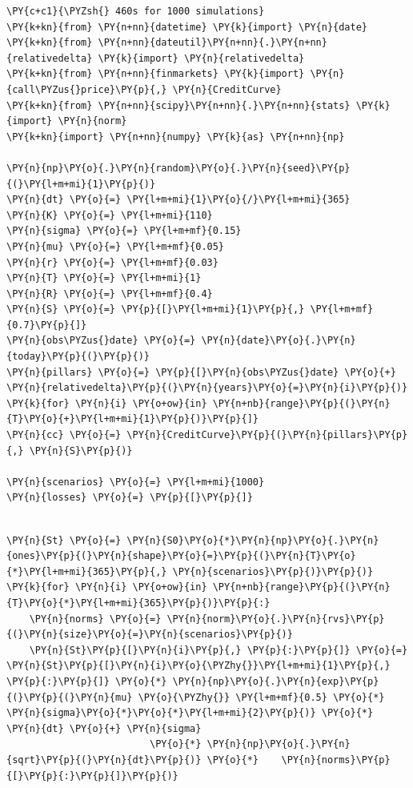 \begin{Answer}
\begin{tcolorbox}[size=fbox, boxrule=1pt, colback=cellbackground, colframe=cellborder]
\begin{Verbatim}[commandchars=\\\{\}]
\PY{c+c1}{\PYZsh{} 460s for 1000 simulations}
\PY{k+kn}{from} \PY{n+nn}{datetime} \PY{k}{import} \PY{n}{date}
\PY{k+kn}{from} \PY{n+nn}{dateutil}\PY{n+nn}{.}\PY{n+nn}{relativedelta} \PY{k}{import} \PY{n}{relativedelta}
\PY{k+kn}{from} \PY{n+nn}{finmarkets} \PY{k}{import} \PY{n}{call\PYZus{}price}\PY{p}{,} \PY{n}{CreditCurve}
\PY{k+kn}{from} \PY{n+nn}{scipy}\PY{n+nn}{.}\PY{n+nn}{stats} \PY{k}{import} \PY{n}{norm}
\PY{k+kn}{import} \PY{n+nn}{numpy} \PY{k}{as} \PY{n+nn}{np}
		
\PY{n}{np}\PY{o}{.}\PY{n}{random}\PY{o}{.}\PY{n}{seed}\PY{p}{(}\PY{l+m+mi}{1}\PY{p}{)}
\PY{n}{dt} \PY{o}{=} \PY{l+m+mi}{1}\PY{o}{/}\PY{l+m+mi}{365}
\PY{n}{K} \PY{o}{=} \PY{l+m+mi}{110}
\PY{n}{sigma} \PY{o}{=} \PY{l+m+mf}{0.15}
\PY{n}{mu} \PY{o}{=} \PY{l+m+mf}{0.05}
\PY{n}{r} \PY{o}{=} \PY{l+m+mf}{0.03}
\PY{n}{T} \PY{o}{=} \PY{l+m+mi}{1}
\PY{n}{R} \PY{o}{=} \PY{l+m+mf}{0.4}
\PY{n}{S} \PY{o}{=} \PY{p}{[}\PY{l+m+mi}{1}\PY{p}{,} \PY{l+m+mf}{0.7}\PY{p}{]}
\PY{n}{obs\PYZus{}date} \PY{o}{=} \PY{n}{date}\PY{o}{.}\PY{n}{today}\PY{p}{(}\PY{p}{)}
\PY{n}{pillars} \PY{o}{=} \PY{p}{[}\PY{n}{obs\PYZus{}date} \PY{o}{+} \PY{n}{relativedelta}\PY{p}{(}\PY{n}{years}\PY{o}{=}\PY{n}{i}\PY{p}{)} \PY{k}{for} \PY{n}{i} \PY{o+ow}{in} \PY{n+nb}{range}\PY{p}{(}\PY{n}{T}\PY{o}{+}\PY{l+m+mi}{1}\PY{p}{)}\PY{p}{]}
\PY{n}{cc} \PY{o}{=} \PY{n}{CreditCurve}\PY{p}{(}\PY{n}{pillars}\PY{p}{,} \PY{n}{S}\PY{p}{)}
		
\PY{n}{scenarios} \PY{o}{=} \PY{l+m+mi}{1000}
\PY{n}{losses} \PY{o}{=} \PY{p}{[}\PY{p}{]}
\end{Verbatim}
\end{tcolorbox}		

\begin{tcolorbox}[size=fbox, boxrule=1pt, colback=cellbackground, colframe=cellborder]
\begin{Verbatim}[commandchars=\\\{\}]

\PY{n}{St} \PY{o}{=} \PY{n}{S0}\PY{o}{*}\PY{n}{np}\PY{o}{.}\PY{n}{ones}\PY{p}{(}\PY{n}{shape}\PY{o}{=}\PY{p}{(}\PY{n}{T}\PY{o}{*}\PY{l+m+mi}{365}\PY{p}{,} \PY{n}{scenarios}\PY{p}{)}\PY{p}{)}    
\PY{k}{for} \PY{n}{i} \PY{o+ow}{in} \PY{n+nb}{range}\PY{p}{(}\PY{n}{T}\PY{o}{*}\PY{l+m+mi}{365}\PY{p}{)}\PY{p}{:}
    \PY{n}{norms} \PY{o}{=} \PY{n}{norm}\PY{o}{.}\PY{n}{rvs}\PY{p}{(}\PY{n}{size}\PY{o}{=}\PY{n}{scenarios}\PY{p}{)}
    \PY{n}{St}\PY{p}{[}\PY{n}{i}\PY{p}{,} \PY{p}{:}\PY{p}{]} \PY{o}{=} \PY{n}{St}\PY{p}{[}\PY{n}{i}\PY{o}{\PYZhy{}}\PY{l+m+mi}{1}\PY{p}{,} \PY{p}{:}\PY{p}{]} \PY{o}{*} \PY{n}{np}\PY{o}{.}\PY{n}{exp}\PY{p}{(}\PY{p}{(}\PY{n}{mu} \PY{o}{\PYZhy{}} \PY{l+m+mf}{0.5} \PY{o}{*} \PY{n}{sigma}\PY{o}{*}\PY{o}{*}\PY{l+m+mi}{2}\PY{p}{)} \PY{o}{*} \PY{n}{dt} \PY{o}{+} \PY{n}{sigma}
                         \PY{o}{*} \PY{n}{np}\PY{o}{.}\PY{n}{sqrt}\PY{p}{(}\PY{n}{dt}\PY{p}{)} \PY{o}{*} 	\PY{n}{norms}\PY{p}{[}\PY{p}{:}\PY{p}{]}\PY{p}{)}
		

\end{Verbatim}
\end{tcolorbox}
\end{Answer}
